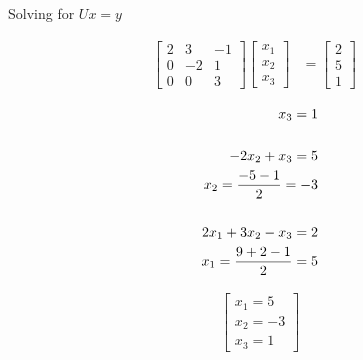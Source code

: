 	Solving for $Ux = y$

	\begin{align}
		\begin{bmatrix}
			2 & 3 & -1 \\[0.3em]
			0 & -2 & 1 \\[0.3em]
			0 & 0 & 3
		\end{bmatrix}
		\begin{bmatrix}
			x_{1} \\[0.3em]
			x_{2} \\[0.3em]
			x_{3}
		\end{bmatrix}&= \begin{bmatrix}
			2 \\[0.3em]
			5 \\[0.3em]
			1
		\end{bmatrix}&
	\label{eq:63x}
	\end{align}	

	\begin{align}
		x_{3} = 1 \\
		\notag \\
		-2x_{2} + x_{3} = 5 \notag \\
		x_{2} = \frac{-5-1}{2} = -3 \\
		\notag \\
		2x_{1} + 3x_{2} - x_{3} = 2 \notag \\
		x_{1} =  \frac{9 + 2 - 1}{2} = 5
	\end{align}

	\begin{align}
		&\begin{bmatrix}
			x_{1} = 5 \\[0.3em]
			x_{2} = -3 \\[0.3em]
			x_{3} = 1
		\end{bmatrix}&
	\label{eq:63result}
	\end{align}